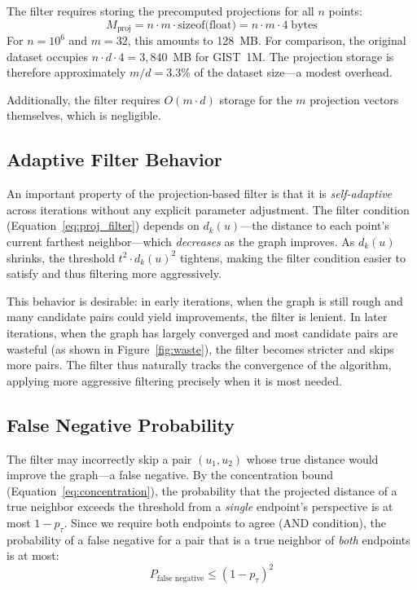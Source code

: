 The filter requires storing the precomputed projections for all $n$ points:
\begin{equation}
    M_{\text{proj}} = n \cdot m \cdot \text{sizeof(float)} = n \cdot m \cdot 4 \;\text{bytes}
    \label{eq:memory}
\end{equation}
For $n = 10^6$ and $m = 32$, this amounts to 128~MB.
For comparison, the original dataset occupies $n \cdot d \cdot 4 = 3{,}840$~MB for GIST~1M.
The projection storage is therefore approximately $m / d = 3.3\%$ of the dataset size---a modest overhead.

Additionally, the filter requires $O(m \cdot d)$ storage for the $m$ projection vectors themselves, which is negligible.

\subsection{Adaptive Filter Behavior}
\label{sec:adaptive}

An important property of the projection-based filter is that it is \emph{self-adaptive} across iterations without any explicit parameter adjustment.
The filter condition (Equation~\ref{eq:proj_filter}) depends on $d_k(u)$---the distance to each point's current farthest neighbor---which \emph{decreases} as the graph improves.
As $d_k(u)$ shrinks, the threshold $t^2 \cdot d_k(u)^2$ tightens, making the filter condition easier to satisfy and thus filtering more aggressively.

This behavior is desirable: in early iterations, when the graph is still rough and many candidate pairs could yield improvements, the filter is lenient.
In later iterations, when the graph has largely converged and most candidate pairs are wasteful (as shown in Figure~\ref{fig:waste}), the filter becomes stricter and skips more pairs.
The filter thus naturally tracks the convergence of the algorithm, applying more aggressive filtering precisely when it is most needed.

\subsection{False Negative Probability}
\label{sec:false_negative}

The filter may incorrectly skip a pair $(u_1, u_2)$ whose true distance would improve the graph---a false negative.
By the concentration bound (Equation~\ref{eq:concentration}), the probability that the projected distance of a true neighbor exceeds the threshold from a \emph{single} endpoint's perspective is at most $1 - p_\tau$.
Since we require both endpoints to agree (AND condition), the probability of a false negative for a pair that is a true neighbor of \emph{both} endpoints is at most:
\begin{equation}
    P_{\text{false negative}} \leq (1 - p_\tau)^2
    \label{eq:fn_prob}
\end{equation}

